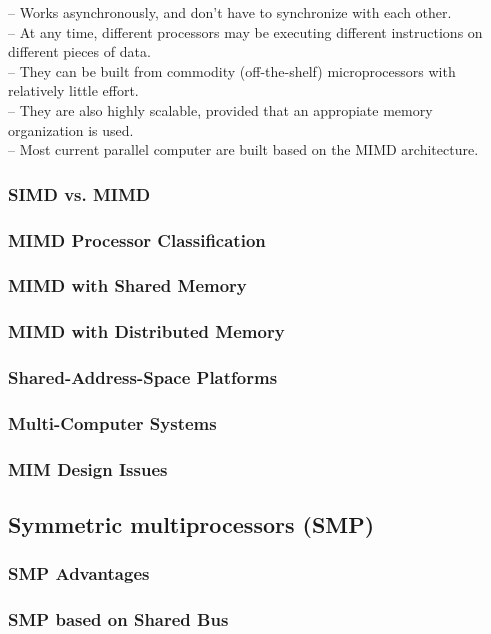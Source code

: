 \documentclass[titlepage, a4paper]{article}
\begin{document}
-- Works asynchronously, and don't have to synchronize with each other. \\
-- At any time, different processors may be executing different instructions on different pieces of data. \\
-- They can be built from commodity (off-the-shelf) microprocessors with relatively little effort. \\
-- They are also highly scalable, provided that an appropiate memory organization is used. \\
-- Most current parallel computer are built based on the MIMD architecture. \\

\subsubsection{SIMD vs. MIMD}
\subsubsection{MIMD Processor Classification}
\subsubsection{MIMD with Shared Memory}
\subsubsection{MIMD with Distributed Memory}
\subsubsection{Shared-Address-Space Platforms}
\subsubsection{Multi-Computer Systems}
\subsubsection{MIM Design Issues}
\subsection{Symmetric multiprocessors (SMP)}
\subsubsection{SMP Advantages}
\subsubsection{SMP based on Shared Bus}
\end{document}
